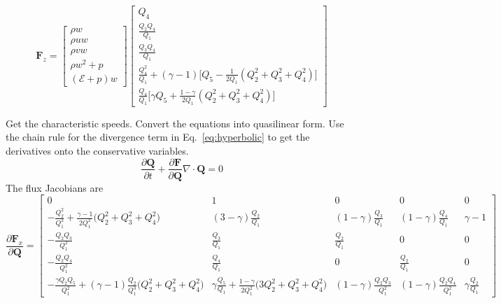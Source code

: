 \documentclass{report}
\begin{document}
\begin{equation}
	\mathbf{F}_z = 
	\begin{bmatrix}
		\rho w \\
		\rho uw \\
		\rho v w \\
		\rho w^2 + p \\
		( \mathcal{E} + p ) w
	\end{bmatrix}
	\begin{bmatrix}
		Q_4 \\
		\frac{Q_2 Q_4}{Q_1} \\
		\frac{Q_3 Q_4}{Q_1} \\
		\frac{Q_4^2}{Q_1} + (\gamma-1) \big[ Q_5 - \frac{1}{2 Q_1} (Q_2^2 + Q_3^2 + Q_4^2) \big] \\
		\frac{Q_4}{Q_1} \big[ \gamma Q_5 + \frac{1-\gamma}{2 Q_1} (Q_2^2+Q_3^2+Q_4^2) \big] 
	\end{bmatrix}
\end{equation}


Get the characteristic speeds. Convert the equations into quasilinear form. 
Use the chain rule for the divergence term in Eq.~\ref{eq:hyperbolic} 
to get the derivatives onto the conservative variables.
\begin{equation}
	\frac{\partial \mathbf{Q}}{\partial t} + \frac{\partial \mathbf{F} }{\partial \mathbf{Q}} \nabla \cdot \mathbf{Q} = 0 \label{eq:quasilinear}
\end{equation}
The flux Jacobians are
\begin{equation}
	\frac{\partial \mathbf{F}_x}{\partial \mathbf{Q}} = 
	\begin{bmatrix}
		0 & 1 & 0 & 0 & 0\\  %
		- \frac{Q_2^2}{Q_1^2} + \frac{\gamma-1}{2 Q_1^2} \big( Q_2^2 + Q_3^2 + Q_4^2 \big) & 
		(3-\gamma) \frac{Q_2}{Q_1} &
		(1-\gamma) \frac{Q_3}{Q_1} &
		(1-\gamma) \frac{Q_4}{Q_1} & 
		\gamma - 1  \\  %
		- \frac{Q_2 Q_3 }{Q_1^2} & 
		\frac{Q_3}{Q_1} &
		\frac{Q_2}{Q_1} &
		0 & 0 \\ %
		- \frac{Q_2 Q_4}{Q_1^2} & 
		\frac{Q_4}{Q_1} & 
		0 & 
		\frac{Q_2}{Q_1} & 0 \\ %
		- \frac{\gamma  Q_2 Q_5}{Q_1^2} + (\gamma-1) \frac{Q_2}{Q_1^3} \big( Q_2^2 + Q_3^2 + Q_4^2 \big) &
		\gamma \frac{Q_5}{Q_1} + \frac{1-\gamma}{2 Q_1^2} \big( 3 Q_2^2 + Q_3^2 + Q_4^2 \big) &
		(1-\gamma) \frac{Q_2 Q_3}{Q_1^2}  & 
		(1-\gamma) \frac{Q_2 Q_4}{Q_1^2} & 
		\gamma \frac{Q_2}{Q_1}
	\end{bmatrix}
\end{equation}
\end{document}
